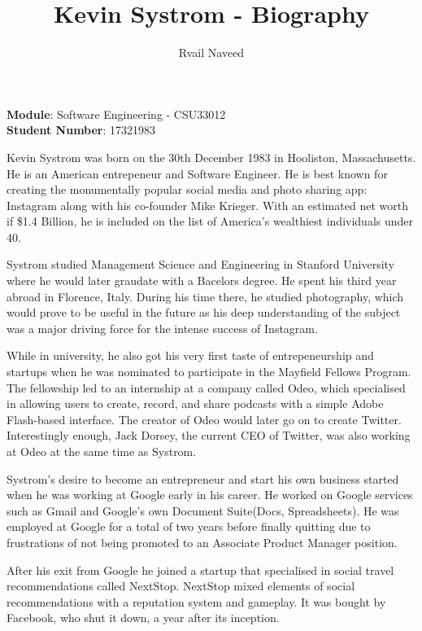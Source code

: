 \documentclass[12pt]{article}
\title{\textbf{Kevin Systrom - Biography}}
\author{Rvail Naveed}
\date{}
\begin{document}
    \maketitle

    \begin{center}
        \textbf{Module}: Software Engineering - CSU33012 \\
        \textbf{Student Number}: 17321983 
    \end{center}

    \newpage

    Kevin Systrom was born on the 30th December 1983 in Hooliston, Massachusetts. He is 
    an American entrepeneur and Software Engineer. He is best known for creating the monumentally
    popular social media and photo sharing app: Instagram along with his co-founder Mike Krieger. With an estimated net
    worth if \$1.4 Billion, he is included on the list of America's wealthiest individuals under 40.

    Systrom studied Management Science and Engineering in Stanford University 
    where he would later graudate with a Bacelors degree. He spent his third year abroad in Florence, Italy.
    During his time there, he studied photography, which would prove to be useful in the future as his deep understanding of the subject
    was a major driving force for the intense success of Instagram.

    While in university, 
    he also got his very first taste of entrepeneurship 
    and startups when he was nominated to participate in the Mayfield Fellows Program. 
    The fellowship led to an internship at a company called Odeo, which specialised in allowing users to
    create, record, and share podcasts with a simple Adobe Flash-based interface.
    The creator of Odeo
    would later go on to create Twitter. Interestingly enough, Jack Dorsey, the current CEO of Twitter, 
    was also working at Odeo at the same time as Systrom.

    Systrom's desire to become an entrepreneur
    and start his own business started when he was working at Google early in his career. He worked on Google services such as Gmail and Google's own
    Document Suite(Docs, Spreadsheets). He was employed at Google for a total of two years before finally quitting
    due to frustrations of not being promoted to an Associate Product Manager position.

    After his exit from Google he joined a startup that specialised in social travel recommendations called 
    NextStop. NextStop mixed elements of social recommendations
    with a reputation system and gameplay. It was bought by Facebook, who shut it down, a year after its inception.
\end{document}
